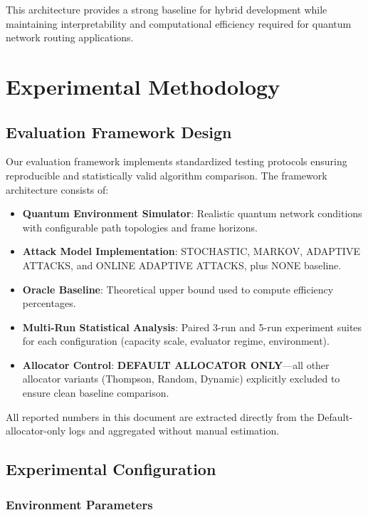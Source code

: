 \documentclass[12pt,a4paper]{article}
\newcommand{\critical}[1]{\textcolor{criticalcolor}{\textbf{#1}}}
\begin{document}
This architecture provides a strong baseline for hybrid development while maintaining interpretability and computational efficiency required for quantum network routing applications.

\section{Experimental Methodology}

\subsection{Evaluation Framework Design}

Our evaluation framework implements standardized testing protocols ensuring reproducible and statistically valid algorithm comparison. The framework architecture consists of:

\begin{itemize}
\item \textbf{Quantum Environment Simulator}: Realistic quantum network conditions with configurable path topologies and frame horizons.
\item \textbf{Attack Model Implementation}: STOCHASTIC, MARKOV, ADAPTIVE ATTACKS, and ONLINE ADAPTIVE ATTACKS, plus NONE baseline.
\item \textbf{Oracle Baseline}: Theoretical upper bound used to compute efficiency percentages.
\item \textbf{Multi-Run Statistical Analysis}: Paired 3-run and 5-run experiment suites for each configuration (capacity scale, evaluator regime, environment).
\item \textbf{Allocator Control}: \critical{\textbf{DEFAULT ALLOCATOR ONLY}}—all other allocator variants (Thompson, Random, Dynamic) explicitly excluded to ensure clean baseline comparison.
\end{itemize}

All reported numbers in this document are extracted directly from the Default-allocator-only logs and aggregated without manual estimation.

\subsection{Experimental Configuration}

\subsubsection{Environment Parameters}
\end{document}
